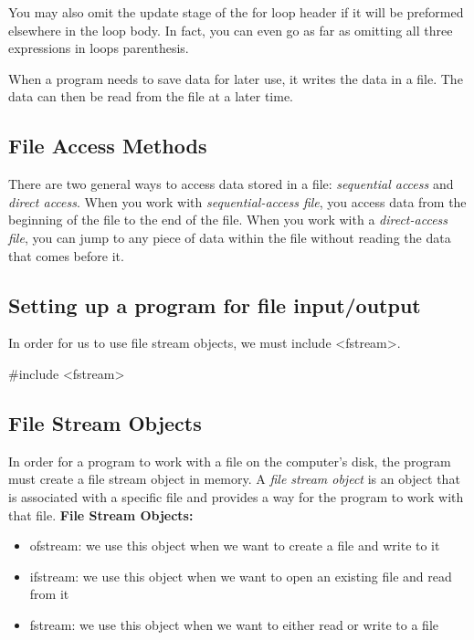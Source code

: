 \documentclass{report}
\begin{document}
    \bigbreak \noindent 
    You may also omit the update stage of the for loop header if it will be preformed elsewhere in the loop body. In fact, you can even go as far as omitting all three expressions in loops parenthesis.

    \pagebreak
    \bigbreak \noindent 
    \begin{concept}
 When a program needs to save data for later use, it writes the data in a file. The data can then be read from the file at a later time.
	\end{concept}
    \bigbreak \noindent 
    \subsection{File Access Methods}
    \bigbreak \noindent 
    There are two general ways to access data stored in a file: \textit{sequential access} and \textit{direct access}. When you work with \textit{sequential-access file}, you access data from the beginning of the file to the end of the file.
    \bigbreak \noindent 
    When you work with a \textit{direct-access file}, you can jump to any piece  of data within the file without reading the data that comes before it.
    \bigbreak \noindent 
    \subsection{Setting up a program for file input/output}
    \bigbreak \noindent 
    In order for us to use file stream objects, we must include <fstream>.
    \bigbreak \noindent 
    
    \begin{cppcode}
#include <fstream>
    \end{cppcode}
    
    \bigbreak \noindent 
    \subsection{File Stream Objects}
    \bigbreak \noindent 
    In order for a program to work with a file on the computer's disk, the program must create a file stream object in memory. A \textit{file stream object} is an object that is associated with a specific file and provides a way for the program to work with that file. 
    \bigbreak \noindent 
    \textbf{File Stream Objects:}
    \begin{itemize}
        \item ofstream: we use this object when we want to create a file and write to it
        \item ifstream: we use this object when we want to open an existing file and read from it
        \item fstream: we use this object when we want to either read or write to a file
    \end{itemize}
\end{document}
